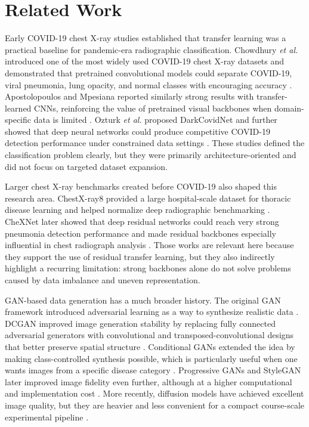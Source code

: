 \documentclass[conference]{IEEEtran}
\begin{document}
\section{Related Work}
Early COVID-19 chest X-ray studies established that transfer learning was a practical baseline for pandemic-era radiographic classification. Chowdhury \textit{et al.} introduced one of the most widely used COVID-19 chest X-ray datasets and demonstrated that pretrained convolutional models could separate COVID-19, viral pneumonia, lung opacity, and normal classes with encouraging accuracy \cite{chowdhury2020}. Apostolopoulos and Mpesiana reported similarly strong results with transfer-learned CNNs, reinforcing the value of pretrained visual backbones when domain-specific data is limited \cite{apostolopoulos2020}. Ozturk \textit{et al.} proposed DarkCovidNet and further showed that deep neural networks could produce competitive COVID-19 detection performance under constrained data settings \cite{ozturk2020}. These studies defined the classification problem clearly, but they were primarily architecture-oriented and did not focus on targeted dataset expansion.

Larger chest X-ray benchmarks created before COVID-19 also shaped this research area. ChestX-ray8 provided a large hospital-scale dataset for thoracic disease learning and helped normalize deep radiographic benchmarking \cite{wang2017}. CheXNet later showed that deep residual networks could reach very strong pneumonia detection performance and made residual backbones especially influential in chest radiograph analysis \cite{rajpurkar2017}. Those works are relevant here because they support the use of residual transfer learning, but they also indirectly highlight a recurring limitation: strong backbones alone do not solve problems caused by data imbalance and uneven representation.

GAN-based data generation has a much broader history. The original GAN framework introduced adversarial learning as a way to synthesize realistic data \cite{goodfellow2014}. DCGAN improved image generation stability by replacing fully connected adversarial generators with convolutional and transposed-convolutional designs that better preserve spatial structure \cite{radford2015}. Conditional GANs extended the idea by making class-controlled synthesis possible, which is particularly useful when one wants images from a specific disease category \cite{mirza2014}. Progressive GANs and StyleGAN later improved image fidelity even further, although at a higher computational and implementation cost \cite{karras2018,karras2019}. More recently, diffusion models have achieved excellent image quality, but they are heavier and less convenient for a compact course-scale experimental pipeline \cite{ho2020}.
\end{document}
